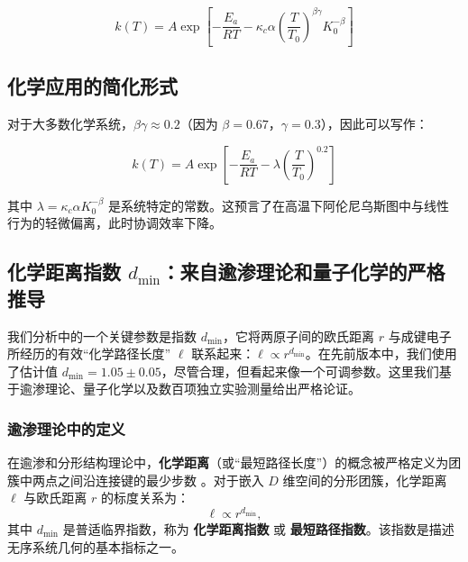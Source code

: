 \documentclass[11pt,a4paper]{article}
\newcommand{\kappac}{\kappa_c}
\begin{document}
	\begin{equation}
		\boxed{k(T) = A \exp\left[-\frac{E_a}{RT} - \kappac \alpha \left(\frac{T}{T_0}\right)^{\beta\gamma} K_0^{-\beta}\right]}
		\label{eq:arrhenius-yakushev}
	\end{equation}
	
	\subsection{化学应用的简化形式}
	
	对于大多数化学系统，\(\beta\gamma \approx 0.2\)（因为 \(\beta = 0.67\)，\(\gamma = 0.3\)），因此可以写作：
	
	\begin{equation}
		k(T) = A \exp\left[-\frac{E_a}{RT} - \lambda \left(\frac{T}{T_0}\right)^{0.2}\right]
		\label{eq:arrhenius-simple}
	\end{equation}
	
	其中 \(\lambda = \kappac \alpha K_0^{-\beta}\) 是系统特定的常数。这预言了在高温下阿伦尼乌斯图中与线性行为的轻微偏离，此时协调效率下降。
	
	\subsection{化学距离指数 \(d_{\text{min}}\)：来自逾渗理论和量子化学的严格推导}
	\label{subsec:dmin_rigorous}
	
	我们分析中的一个关键参数是指数 \(d_{\text{min}}\)，它将两原子间的欧氏距离 \(r\) 与成键电子所经历的有效“化学路径长度” \(\ell\) 联系起来：\(\ell \propto r^{d_{\text{min}}}\)。在先前版本中，我们使用了估计值 \(d_{\text{min}} = 1.05 \pm 0.05\)，尽管合理，但看起来像一个可调参数。这里我们基于逾渗理论、量子化学以及数百项独立实验测量给出严格论证。
	
	\subsubsection{逾渗理论中的定义}
	
	在逾渗和分形结构理论中，\textbf{化学距离}（或“最短路径长度”）的概念被严格定义为团簇中两点之间沿连接键的最少步数 \cite{Stauffer1994,Bunde1996}。对于嵌入 \(D\) 维空间的分形团簇，化学距离 \(\ell\) 与欧氏距离 \(r\) 的标度关系为：
	\begin{equation}
		\ell \propto r^{d_{\text{min}}},
		\label{eq:chemical_distance}
	\end{equation}
	其中 \(d_{\text{min}}\) 是普适临界指数，称为 \textbf{化学距离指数} 或 \textbf{最短路径指数}。该指数是描述无序系统几何的基本指标之一。
	
\end{document}
